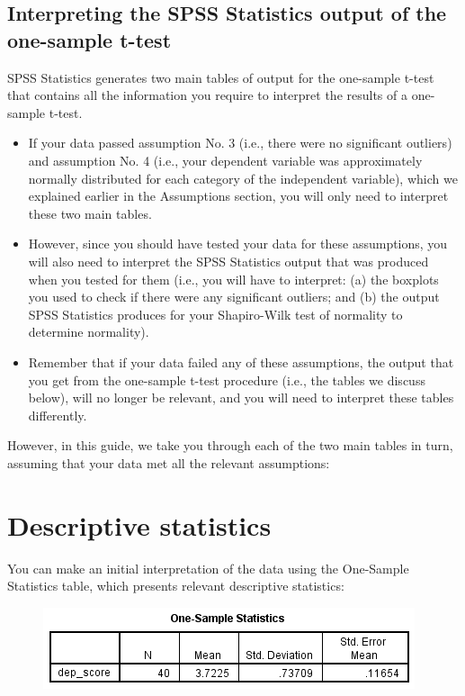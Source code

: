 \documentclass[]{article}
\begin{document}
\subsection{Interpreting the SPSS Statistics output of the one-sample t-test}
SPSS Statistics generates two main tables of output for the one-sample t-test that contains all the information you require to interpret the results of a one-sample t-test.
\begin{itemize}
	\item If your data passed assumption No. 3 (i.e., there were no significant outliers) and assumption No. 4 (i.e., your dependent variable was approximately normally distributed for each category of the independent variable), which we explained earlier in the Assumptions section, you will only need to interpret these two main tables. 
	\item However, since you should have tested your data for these assumptions, you will also need to interpret the SPSS Statistics output that was produced when you tested for them (i.e., you will have to interpret: (a) the boxplots you used to check if there were any significant outliers; and (b) the output SPSS Statistics produces for your Shapiro-Wilk test of normality to determine normality). 
	\item Remember that if your data failed any of these assumptions, the output that you get from the one-sample t-test procedure (i.e., the tables we discuss below), will no longer be relevant, and you will need to interpret these tables differently.
\end{itemize}


However, in this guide, we take you through each of the two main tables in turn, assuming that your data met all the relevant assumptions:

\newpage
\section{Descriptive statistics}
You can make an initial interpretation of the data using the One-Sample Statistics table, which presents relevant descriptive statistics:

\begin{figure}[h!]
\centering
\includegraphics[width=0.7\linewidth]{OneSample/OneSample-DescriptiveStatistics1}
\label{fig:OneSample-DescriptiveStatistics1}
\end{figure}
\end{document}
